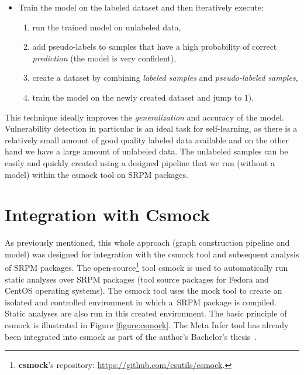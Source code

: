 \begin{itemize}
    \item Train the model on the labeled dataset and then iteratively execute:
        \begin{enumerate}
            \item run the trained model on unlabeled data,
            \item add pseudo-labels to samples that have a high probability of correct \textit{prediction} (the model is very confident),
            \item create a dataset by combining \textit{labeled samples} and \textit{pseudo-labeled samples},
            \item train the model on the newly created dataset and jump to 1).
        \end{enumerate}
\end{itemize}

This technique ideally improves the \textit{generalization} and accuracy of the model. Vulnerability detection in particular is an ideal task for self-learning, as there is a relatively small amount of good quality labeled data available and on the other hand we have a large amount of unlabeled data. The unlabeled samples can be easily and quickly created using a designed pipeline that we run (without a model) within the csmock tool on SRPM packages.


\section{Integration with Csmock}
\label{csmock} 

As previously mentioned, this whole approach (graph construction pipeline and model) was designed for integration with the csmock tool \cite{CsmockFLOCK, CsmockAVM} and subsequent analysis of SRPM packages. The open-source\footnote{\textbf{csmock}'s repository: \url{https://github.com/csutils/csmock}.} tool csmock is used to automatically run static analyses over SRPM packages (tool source packages for Fedora and CentOS operating systems). The csmock tool uses the mock tool to create an isolated and controlled environment in which a~SRPM package is compiled. Static analyses are also run in this created environment. The basic principle of csmock is illustrated in Figure \ref{figure:csmock}. The Meta Infer tool has already been integrated into csmock as part of the author's Bachelor's thesis~\cite{bc}. 

